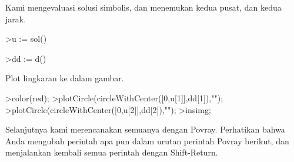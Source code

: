 \documentclass{article}
\begin{document}
\begin{eulernotebook}
\begin{eulercomment}
\begin{eulercomment}
\begin{eulercomment}
\begin{eulercomment}
\begin{eulercomment}
Kami mengevaluasi solusi simbolis, dan menemukan kedua pusat, dan
kedua jarak.
\end{eulercomment}
\begin{eulerprompt}
>u := sol()
\end{eulerprompt}
\begin{euleroutput}
  [0.333333,  1]
\end{euleroutput}
\begin{eulerprompt}
>dd := d()
\end{eulerprompt}
\begin{euleroutput}
  [0.149071,  0.447214]
\end{euleroutput}
\begin{eulercomment}
Plot lingkaran ke dalam gambar.
\end{eulercomment}
\begin{eulerprompt}
>color(red);
>plotCircle(circleWithCenter([0,u[1]],dd[1]),"");
>plotCircle(circleWithCenter([0,u[2]],dd[2]),"");
>insimg;
\end{eulerprompt}
\begin{eulercomment}
Selanjutnya kami merencanakan semuanya dengan Povray. Perhatikan bahwa
Anda mengubah perintah apa pun dalam urutan perintah Povray berikut,
dan menjalankan kembali semua perintah dengan Shift-Return.


\end{eulercomment}
\end{eulercomment}
\end{eulercomment}
\end{eulercomment}
\end{eulercomment}
\end{eulernotebook}
\end{document}
